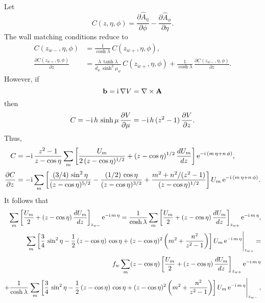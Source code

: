 \documentclass[12pt,prb,aps,notitlepage]{revtex4-1}
\begin{document}
Let
\begin{equation}
C(z,\eta,\phi) = \frac{\partial \hat{A}_\eta}{\partial \phi}- \frac{\partial \hat{A}_\phi}{\partial \eta}.
\end{equation}
The wall matching conditions reduce to 
\begin{align}
C(z_{w-},\eta,\phi) &= \frac{1}{\cosh\lambda}\,C(z_{w+},\eta,\phi),\\[0.5ex]
\frac{\partial C(z_{w+},\eta,\phi) }{\partial z}& = \frac{\lambda\,\tanh\lambda}{\bar{d}_w\,\sinh^2\mu_w}\,C(z_{w+},\eta,\phi) +\frac{1}{\cosh\lambda}\,\frac{\partial C(z_{w-},\eta,\phi) }{\partial z}.
\end{align}
However, if
\begin{equation}
{\bf b} = {\rm i}\,\nabla V =\nabla\times {\bf A}
\end{equation}
then
\begin{equation}
C = -{\rm i}\,h\,\sinh\mu\,\frac{\partial V}{\partial \mu} = -{\rm i}\,h\,(z^2-1)\,\frac{\partial V}{\partial z}.
\end{equation}
Thus,
\begin{align}
C &= -{\rm i}\,\frac{z^2-1}{z-\cos\eta}\sum_m\left[\frac{U_m}{2\,(z-\cos\eta)^{1/2}} + (z-\cos\eta)^{1/2}\,\frac{dU_m}{dz}\right]{\rm e}^{-{\rm i}\,(m\,\eta+n\,\phi)},\\[0.5ex]
\frac{\partial C}{\partial z} &= -{\rm i}\sum_m\left[\frac{(3/4)\,\sin^2\eta}{(z-\cos\eta)^{5/2}}-\frac{(1/2)\,\cos\eta}{(z-\cos\eta)^{3/2}}+ \frac{m^2+n^2/(z^2-1)}{(z-\cos\eta)^{1/2}}\right]
U_m\,{\rm e}^{-{\rm i}\,(m\,\eta+n\,\phi)}.
\end{align}
It follows that
\begin{align}
\sum_m\left[\frac{U_m}{2}+(z-\cos\eta)\,\frac{dU_m}{dz}\right]_{z_{w-}}{\rm e}^{-{\rm i}\,m\,\eta}= \frac{1}{\cosh\lambda}\sum_m\left[\frac{U_m}{2}+(z-\cos\eta)\,\frac{dU_m}{dz}\right]_{z_{w+}}{\rm e}^{-{\rm i}\,m\,\eta},\\[0.5ex]
\left.\sum_m\left[\frac{3}{4}\,\sin^2\eta-\frac{1}{2}\,(z-\cos\eta)\,\cos\eta+ (z-\cos\eta)^2\left(m^2+\frac{n^2}{z^2-1}\right)\right]
U_m\,{\rm e}^{-{\rm i}\,m\,\eta}\right|_{z_{w+}}=\nonumber\\[0.5ex]
f_w \sum_m(z-\cos\eta)\left[\frac{U_m}{2}+(z-\cos\eta)\,\frac{dU_m}{dz}\right]_{z_{w+}}{\rm e}^{-{\rm i}\,m\,\eta}\nonumber\\[0.5ex]
+\frac{1}{\cosh\lambda}\left.\sum_m\left[\frac{3}{4}\,\sin^2\eta-\frac{1}{2}\,(z-\cos\eta)\,\cos\eta+ (z-\cos\eta)^2\left(m^2+\frac{n^2}{z^2-1}\right)\right]
U_m\,{\rm e}^{-{\rm i}\,m\,\eta}\right|_{z_{w-}},
\end{align}
\end{document}
